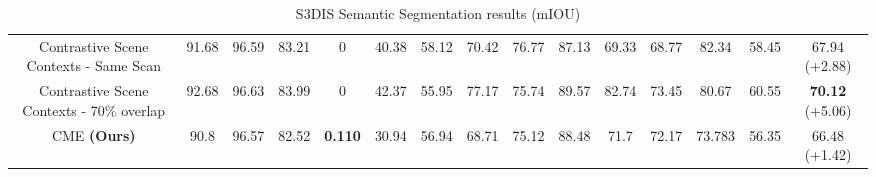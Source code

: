 \documentclass[10pt,twocolumn,letterpaper]{article}
\begin{document}
\begin{table}[t!]
{\begin{tabular}{ c | c c c c c c c c c c c c c | c }
            Contrastive Scene Contexts - Same Scan    & 91.68          & 96.59          & 83.21          & 0              & 40.38          & 58.12          & 70.42          & 76.77          & 87.13          & 69.33          & 68.77          & 82.34          & 58.45          & 67.94 (+2.88)          \\
            Contrastive Scene Contexts - 70\% overlap & 92.68          & 96.63          & 83.99          & 0              & 42.37          & 55.95          & 77.17          & 75.74          & 89.57          & 82.74          & 73.45          & 80.67          & 60.55          & \textbf{70.12} (+5.06) \\
            CME \textbf{(Ours)}                       & 90.8           & 96.57          & 82.52          & \textbf{0.110} & 30.94          & 56.94          & 68.71          & 75.12          & 88.48          & 71.7           & 72.17          & 73.783         & 56.35          & 66.48 (+1.42)          \\
        \end{tabular}
    }
    \caption{S3DIS Semantic Segmentation results (mIOU)}
    \label{table:s3disResults}
\end{table}
\end{document}
